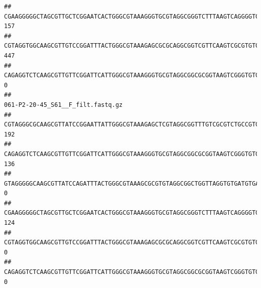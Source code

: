 \documentclass[]{article}
\begin{document}
\begin{verbatim}
## CGAAGGGGGCTAGCGTTGCTCGGAATCACTGGGCGTAAAGGGTGCGTAGGCGGGTCTTTAAGTCAGGGGTGAAATCCTGGAGCTCAACTCCAGAACTGCCTTTGATACTGAAGATCTTGAGTTCGGGAGAGGTGAGTGGAACTGCGAGTGTAGAGGTGAAATTCGTAGATATTCGCAAGAACACCAGTGGCGAAGGCGGCTCACTGGCCCGATACTGACGCTGAGGCACGAAAGCGTGGGGAGCAAACA                              157
## CGTAGGTGGCAAGCGTTGTCCGGATTTACTGGGCGTAAAGAGCGCGCAGGCGGTCGTTCAAGTCGCGTGTGAAAGCCCCCGGCTCAACTGGGGAGGGTCACGCGATACTGATCGACTCGAAGGCAGGAGAGGGTAGTGGAATTCCCGGTGTAGTGGTGAAATGCGTAGATATCGGGAGGAACACCAGTGGCGAAGGCGACTACCTGGCCTGTTCTTGACGCTGAGGCGCGAAAGCTAGGGGAGCAAACG                              447
## CAGAGGTCTCAAGCGTTGTTCGGATTCATTGGGCGTAAAGGGTGCGTAGGCGGCGCGGTAAGTCGGGTGTGAAATCTCGGGGCTTAACTCCGAAACTGCATTCGATACTGCCGTGCTTGAGGACTGGAGAGGAGACTGGAATTTACGGTGTAGCGGTGAAATGCGTAGATATCGTAAGGAAGACCAGTGGCGAAGGCGGGTCTCTGGACAGTTCCTGACGCTGAGGCACGAAGGCCAGGGGAGCAAACG                                0
##                                                                                                                                                                                                                                                           061-P2-20-45_S61__F_filt.fastq.gz
## CGTAGGGCGCAAGCGTTATCCGGAATTATTGGGCGTAAAGAGCTCGTAGGCGGTTTGTCGCGTCTGCCGTGAAAGTCCGGGGCTCAACTCCGGATCTGCGGTGGGTACGGGCAGACTAGAGTGATGTAGGGGAGACTGGAATTCCTGGTGTAGCGGTGAAATGCGCAGATATCAGGAGGAACACCGATGGCGAAGGCAGGTCTCTGGGCATTAACTGACGCTGAGGAGCGAAAGCATGGGGAGCGAACA                               192
## CAGAGGTCTCAAGCGTTGTTCGGATTCATTGGGCGTAAAGGGTGCGTAGGCGGCGCGGTAAGTCGGGTGTGAAATCTCGGAGCTTAACTCCGAAACTGCATTCGATACTGCCGTGCTTGAGGACTGGAGAGGAGACTGGAATTTACGGTGTAGCGGTGAAATGCGTAGATATCGTAAGGAAGACCAGTGGCGAAGGCGGGTCTCTGGACAGTTCCTGACGCTGAGGCACGAAGGCCAGGGGAGCAAACG                               136
## GTAGGGGGCAAGCGTTATCCAGATTTACTGGGCGTAAAGCGCGTGTAGGCGGCTGGTTAGGTGTGATGTGAAATCTTCCGGCTCAACCGGAAAACTGCATTGCAAACCGGCCTGGCTAGAGTGCAGGAGAGGGAAGCGGAATTCCAGGTGTAGCGGTGAAATGCGTAGATATCTGGAGGAACACCAGTGGCGAAGGCGGCTTCCTGGCCTGCAACTGACGCTGAGACGCGAAAGCGTGGGGAGCGAAC                                  0
## CGAAGGGGGCTAGCGTTGCTCGGAATCACTGGGCGTAAAGGGTGCGTAGGCGGGTCTTTAAGTCAGGGGTGAAATCCTGGAGCTCAACTCCAGAACTGCCTTTGATACTGAAGATCTTGAGTTCGGGAGAGGTGAGTGGAACTGCGAGTGTAGAGGTGAAATTCGTAGATATTCGCAAGAACACCAGTGGCGAAGGCGGCTCACTGGCCCGATACTGACGCTGAGGCACGAAAGCGTGGGGAGCAAACA                               124
## CGTAGGTGGCAAGCGTTGTCCGGATTTACTGGGCGTAAAGAGCGCGCAGGCGGTCGTTCAAGTCGCGTGTGAAAGCCCCCGGCTCAACTGGGGAGGGTCACGCGATACTGATCGACTCGAAGGCAGGAGAGGGTAGTGGAATTCCCGGTGTAGTGGTGAAATGCGTAGATATCGGGAGGAACACCAGTGGCGAAGGCGACTACCTGGCCTGTTCTTGACGCTGAGGCGCGAAAGCTAGGGGAGCAAACG                                 0
## CAGAGGTCTCAAGCGTTGTTCGGATTCATTGGGCGTAAAGGGTGCGTAGGCGGCGCGGTAAGTCGGGTGTGAAATCTCGGGGCTTAACTCCGAAACTGCATTCGATACTGCCGTGCTTGAGGACTGGAGAGGAGACTGGAATTTACGGTGTAGCGGTGAAATGCGTAGATATCGTAAGGAAGACCAGTGGCGAAGGCGGGTCTCTGGACAGTTCCTGACGCTGAGGCACGAAGGCCAGGGGAGCAAACG                                 0

\end{verbatim}
\end{document}
